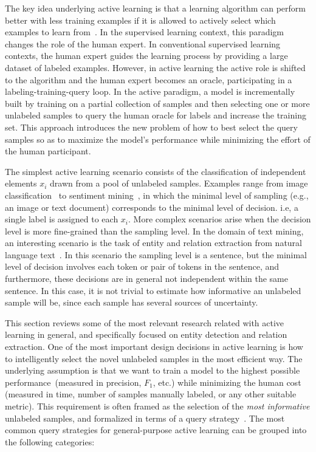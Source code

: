The key idea underlying active learning is that a learning algorithm can perform better with less training examples if it is allowed to actively select which examples to learn from~\cite{survey}.
In the supervised learning context, this paradigm changes the role of the human expert.
In conventional supervised learning contexts, the human expert guides the learning process by providing a large dataset of labeled examples. However, in active learning the active role is shifted to the algorithm and the human expert becomes an oracle, participating in a labeling-training-query loop.
In the active paradigm,  a model is incrementally built by training on a partial collection of samples and then selecting one or more unlabeled samples to query the human oracle for labels and increase the training set.
This approach introduces the new problem of how to best select the query samples so as to maximize the model's performance while minimizing the effort of the human participant.

The simplest active learning scenario consists of  the classification of independent elements $x_i$ drawn from a pool of unlabeled samples.
Examples range from image classification~\cite{Gal2017DeepBA} to sentiment mining~\cite{Kranjc2015ActiveLF},  in which the minimal level of sampling (e.g., an image or text document) corresponds to the minimal level of decision. i.e, a single label is assigned to each $x_i$. More complex scenarios arise when the decision level is more fine-grained than the sampling level. In the domain of text mining, an interesting scenario is the task of entity and relation extraction from natural language text~\cite{zhang2012unified}.
In this scenario the sampling level is a sentence, but the minimal level of decision involves each token or pair of tokens in the sentence, and furthermore, these decisions are in general not independent within the same sentence.
In this case, it is not trivial to estimate how informative an unlabeled sample will be, since each sample has several sources of uncertainty.

This section reviews some of the most relevant research related with active learning in general, and specifically focused on entity detection and relation extraction.
One of the most important design decisions in active learning is how to intelligently select the novel unlabeled samples in the most efficient way. The underlying assumption is that we want to train a
model to the highest possible performance~(measured in precision, $F_1$, etc.) while minimizing the human cost (measured in time, number of samples manually labeled, or any other suitable metric).
This requirement is often framed as the selection of the \textit{most informative} unlabeled samples, and formalized in terms of a query strategy~\cite{survey}.
The most common query strategies for general-purpose active learning can be grouped into the following categories:

